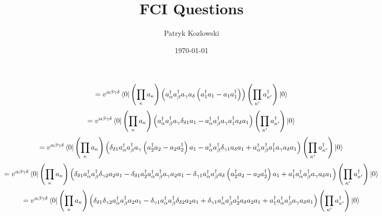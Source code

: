 \documentclass[12pt]{article}
\title{FCI Questions}
\author{Patryk Kozlowski}
\date{\today}
\begin{document}
\maketitle
\begin{dmath}
    =v^{\alpha\beta\gamma\delta}\bra{0}\left(\prod_{\kappa}^{}a_{\kappa}\right)\left(a^{\dag}_{\alpha}a^{\dag}_{\beta}a_{\gamma}a_{\delta}\left(a^{\dag}_{1}a_{1}-a_{1}a^{\dag}_{1}\right)\right)\left(\prod_{\kappa^{\prime}}^{}a^{\dag}_{\kappa^{\prime}}\right)\ket{0}
\end{dmath}
\begin{dmath}
    =v^{\alpha\beta\gamma\delta}\bra{0}\left(\prod_{\kappa}^{}a_{\kappa}\right)\left(a^{\dag}_{\alpha}a^{\dag}_{\beta}a_{\gamma}\delta_{\delta1}a_{1}-a^{\dag}_{\alpha}a^{\dag}_{\beta}a_{\gamma}a^{\dag}_{1}a_{\delta}a_{1}\right)\left(\prod_{\kappa^{\prime}}^{}a^{\dag}_{\kappa^{\prime}}\right)\ket{0}
\end{dmath}
\begin{dmath}
    =v^{\alpha\beta\gamma\delta}\bra{0}\left(\prod_{\kappa}^{}a_{\kappa}\right)\left(\delta_{\delta1}a^{\dag}_{\alpha}a^{\dag}_{\beta}a_{\gamma}\left(a^{\dag}_{2}a_{2}-a_{2}a^{\dag}_{2}\right)a_{1}-a^{\dag}_{\alpha}a^{\dag}_{\beta}\delta_{\gamma1}a_{\delta}a_{1}+a^{\dag}_{\alpha}a^{\dag}_{\beta}a^{\dag}_{1}a_{\gamma}a_{\delta}a_{1}\right)\left(\prod_{\kappa^{\prime}}^{}a^{\dag}_{\kappa^{\prime}}\right)\ket{0}
\end{dmath}
\begin{dmath}
    =v^{\alpha\beta\gamma\delta}\bra{0}\left(\prod_{\kappa}^{}a_{\kappa}\right)\left(
        \delta_{\delta1}a^{\dag}_{\alpha}a^{\dag}_{\beta}\delta_{\gamma2}a_{2}a_{1}
    -\delta_{\delta1}a^{\dag}_{2}a^{\dag}_{\alpha}a^{\dag}_{\beta}a_{\gamma}a_{2}a_{1}
    -\delta_{\gamma1}a^{\dag}_{\alpha}a^{\dag}_{\beta}a_{\delta}\left(a^{\dag}_{2}a_{2}-a_{2}a^{\dag}_{2}\right)a_{1}+a^{\dag}_{1}a^{\dag}_{\alpha}a^{\dag}_{\beta}a_{\gamma}a_{\delta}a_{1}
    \right)\left(\prod_{\kappa^{\prime}}^{}a^{\dag}_{\kappa^{\prime}}\right)\ket{0}
\end{dmath}
\begin{dmath}
    =v^{\alpha\beta\gamma\delta}\bra{0}\left(\prod_{\kappa}^{}a_{\kappa}\right)\left(
        \delta_{\delta1}\delta_{\gamma2}a^{\dag}_{\alpha}a^{\dag}_{\beta}a_{2}a_{1}-\delta_{\gamma1}a^{\dag}_{\alpha}a^{\dag}_{\beta}\delta_{\delta2}a_{2}a_{1}+\delta_{\gamma1}a^{\dag}_{\alpha}a^{\dag}_{\beta}a^{\dag}_{2}a_{\delta}a_{2}a_{1}+a^{\dag}_{1}a^{\dag}_{\alpha}a^{\dag}_{\beta}a_{\gamma}a_{\delta}a_{1}
    \right)\left(\prod_{\kappa^{\prime}}^{}a^{\dag}_{\kappa^{\prime}}\right)\ket{0}
\end{dmath}
\end{document}
